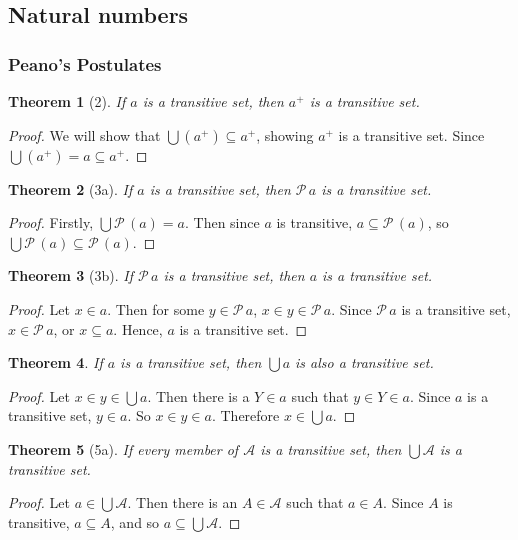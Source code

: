 \documentclass[12pt]{article}
\theoremstyle{plain}
\newtheorem*{exthm}{Theorem}
\theoremstyle{remark}
\theoremstyle{definition}
\theoremstyle{remark}
\newcommand{\powerset}{\mathscr{P}\,}
\begin{document}
\subsection{Natural numbers}
\subsubsection{Peano's Postulates}
\begin{exthm}[2]
  If $a$ is a transitive set, then $a^+$ is a transitive set.
\end{exthm}
\begin{proof}
  We will show that $\bigcup (a^+) \subseteq a^+$, showing $a^+$ is a transitive set. Since $\bigcup (a^+) = a \subseteq a^+$.
\end{proof}

\begin{exthm}[3a]
  If $a$ is a transitive set, then $\powerset a$ is a transitive set.
\end{exthm}
\begin{proof}
  Firstly, $\bigcup \powerset(a) = a$. Then since $a$ is transitive, $a \subseteq \powerset(a)$, so $\bigcup \powerset(a) \subseteq \powerset(a)$.
\end{proof}

\begin{exthm}[3b]
  If $\powerset a$ is a transitive set, then $a$ is a transitive set.
\end{exthm}
\begin{proof}
  Let $x \in a$. Then for some $y \in \powerset a$, $x \in y \in \powerset a$. Since $\powerset a$ is a transitive set, $x \in \powerset a$, or $x \subseteq a$. Hence, $a$ is a transitive set.
\end{proof}

\begin{exthm}
  If $a$ is a transitive set, then $\bigcup a$ is also a transitive set.
\end{exthm}
\begin{proof}
  Let $x \in y \in \bigcup a$. Then there is a $Y \in a$ such that $y \in Y \in a$. Since $a$ is a transitive set, $y \in a$. So $x \in y \in a$. Therefore $x \in \bigcup a$.
\end{proof}

\begin{exthm}[5a]
  If every member of $\mathscr{A}$ is a transitive set, then $\bigcup \mathscr{A}$ is a transitive set.
\end{exthm}
\begin{proof}
  Let $a \in \bigcup \mathscr{A}$. Then there is an $A \in \mathscr{A}$ such that $a \in A$. Since $A$ is transitive, $a \subseteq A$, and so $a \subseteq \bigcup \mathscr{A}$.
\end{proof}
\end{document}
